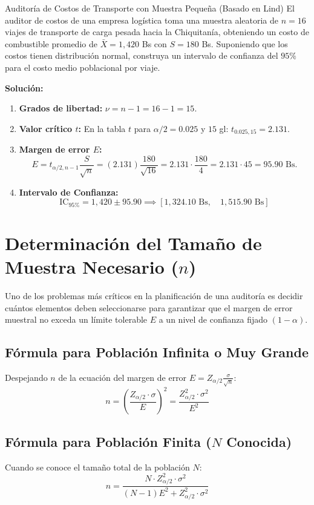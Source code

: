 \begin{ejemplo}{Auditoría de Costos de Transporte con Muestra Pequeña (Basado en Lind)}
El auditor de costos de una empresa logística toma una muestra aleatoria de $n = 16$ viajes de transporte de carga pesada hacia la Chiquitanía, obteniendo un costo de combustible promedio de $\bar{X} = 1{,}420$ Bs con $S = 180$ Bs. Suponiendo que los costos tienen distribución normal, construya un intervalo de confianza del $95\%$ para el costo medio poblacional por viaje.

\tcbline
\textbf{Solución:}
\begin{enumerate}
    \item \textbf{Grados de libertad:} $\nu = n - 1 = 16 - 1 = 15$.
    \item \textbf{Valor crítico $t$:} En la tabla $t$ para $\alpha/2 = 0.025$ y $15$ gl: $t_{0.025, 15} = 2.131$.
    \item \textbf{Margen de error $E$:}
    \[
    E = t_{\alpha/2, n-1} \frac{S}{\sqrt{n}} = (2.131) \frac{180}{\sqrt{16}} = 2.131 \cdot \frac{180}{4} = 2.131 \cdot 45 = 95.90 \text{ Bs.}
    \]
    \item \textbf{Intervalo de Confianza:}
    \[
    \text{IC}_{95\%} = 1{,}420 \pm 95.90 \implies [1{,}324.10 \text{ Bs}, \quad 1{,}515.90 \text{ Bs}]
    \]
\end{enumerate}
\end{ejemplo}

\section{Determinación del Tamaño de Muestra Necesario ($n$)}
Uno de los problemas más críticos en la planificación de una auditoría es decidir cuántos elementos deben seleccionarse para garantizar que el margen de error muestral no exceda un límite tolerable $E$ a un nivel de confianza fijado $(1-\alpha)$.

\subsection{Fórmula para Población Infinita o Muy Grande}
Despejando $n$ de la ecuación del margen de error $E = Z_{\alpha/2} \frac{\sigma}{\sqrt{n}}$:
\begin{equation}
    n = \left( \frac{Z_{\alpha/2} \cdot \sigma}{E} \right)^2 = \frac{Z_{\alpha/2}^2 \cdot \sigma^2}{E^2}
\end{equation}

\subsection{Fórmula para Población Finita ($N$ Conocida)}
Cuando se conoce el tamaño total de la población $N$:
\begin{equation}
    n = \frac{N \cdot Z_{\alpha/2}^2 \cdot \sigma^2}{(N - 1) E^2 + Z_{\alpha/2}^2 \cdot \sigma^2}
\end{equation}

